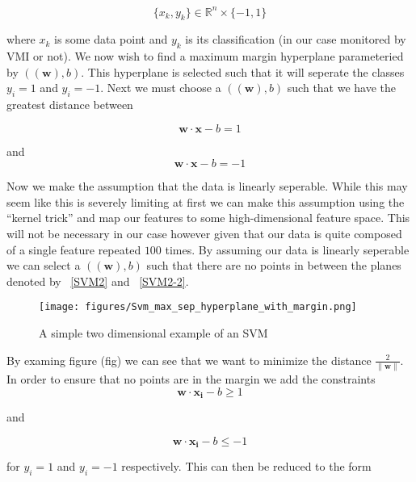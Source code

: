 \begin{equation}\label{SVM1}
	\{x_k,y_k\}\in \mathbb{R}^n \times \{-1,1\}
\end{equation}

where $x_k$ is some data point and $y_k$ is its classification (in our case monitored by VMI or not). We now wish to find a maximum margin hyperplane parameteried by $((\bm{w}),b)$. This hyperplane is selected such that it will seperate the classes $y_i=1$ and $y_i=-1$. Next we must choose a $((\bm{w}),b)$ such that we have the greatest distance between

\begin{equation}\label{SVM2}
	\bm{w}\cdot \bm{x} -b = 1
\end{equation}

and
\begin{equation}\label{SVM2-2}
	\bm{w}\cdot \bm{x} -b = -1 
\end{equation}

Now we make the assumption that the data is linearly seperable. While this may seem like this is severely limiting at first we can make this assumption using the ``kernel trick'' and map our features to some high-dimensional feature space. This will not be necessary in our case however given that our data is quite composed of a single feature repeated $100$ times. By assuming our data is linearly seperable we can select a $((\bm{w}),b)$ such that there are no points in between the planes denoted by ~\ref{SVM2} and ~\ref{SVM2-2}. 


\begin{figure}[p!]\label{MaxMargin}
	  \centering
	  \texttt{[image: figures/Svm\_max\_sep\_hyperplane\_with\_margin.png]}
	  \caption{A simple two dimensional example of an SVM}
\end{figure}

By examing figure (fig) we can see that we want to minimize the distance $\frac{2}{\|\bm{w}\|}$. In order to ensure that no points are in the margin we add the constraints
\begin{equation}\label{ConstraintOne}
	\bm{w}\cdot \bm{x_i} -b \ge 1 
\end{equation}

and 

\begin{equation}\label{ConstraintTwo}
	\bm{w}\cdot \bm{x_i} -b \le -1 
\end{equation}

for $y_i=1$ and $y_i=-1$ respectively. This can then be reduced to the form 

